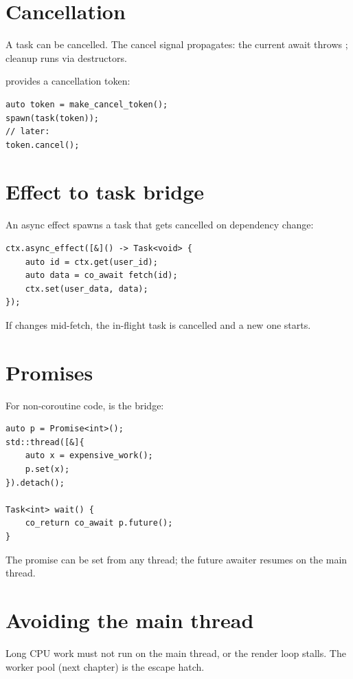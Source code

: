 \section{Cancellation}

A task can be cancelled. The cancel signal propagates: the
current await throws ; cleanup runs via
destructors.

\maya{} provides a cancellation token:

\begin{lstlisting}
auto token = make_cancel_token();
spawn(task(token));
// later:
token.cancel();
\end{lstlisting}

\section{Effect to task bridge}

An async effect spawns a task that gets cancelled on
dependency change:

\begin{lstlisting}
ctx.async_effect([&]() -> Task<void> {
    auto id = ctx.get(user_id);
    auto data = co_await fetch(id);
    ctx.set(user_data, data);
});
\end{lstlisting}

If  changes mid-fetch, the in-flight task is
cancelled and a new one starts.

\section{Promises}

For non-coroutine code,  is the bridge:

\begin{lstlisting}
auto p = Promise<int>();
std::thread([&]{
    auto x = expensive_work();
    p.set(x);
}).detach();

Task<int> wait() {
    co_return co_await p.future();
}
\end{lstlisting}

The promise can be set from any thread; the future
awaiter resumes on the main thread.

\section{Avoiding the main thread}

Long CPU work must not run on the main thread, or the
render loop stalls. The worker pool (next chapter) is the
escape hatch.

